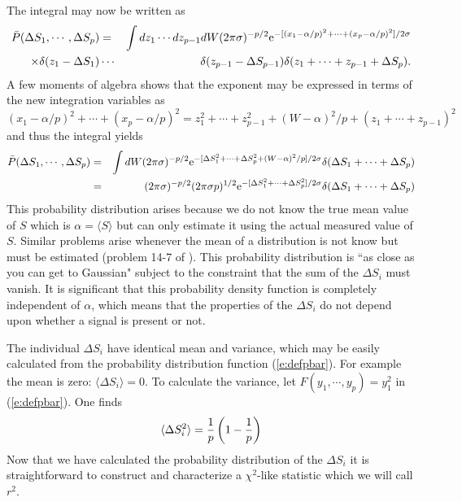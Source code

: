 The integral may now be written as
\begin{eqnarray}
\nonumber
\bar P (\Delta S_1,\cdots,\Delta S_p) &= &\int  dz_1 \cdots dz_{p-1} dW (2 \pi
\sigma)^{-p/2} {\rm e}^{-[(x_1 - \alpha/p)^2 + \cdots + (x_p - \alpha/p)^2]/ 2 \sigma} \\
\times \delta(z_1-\Delta S_1) & \cdots & \delta(z_{p-1}-\Delta S_{p-1}) \delta(z_1+\cdots + z_{p-1}+\Delta S_p).
\end{eqnarray}
A few moments of algebra shows that the exponent may be expressed in terms of the new
integration variables as
\begin{equation}
(x_1 - \alpha/p)^2 + \cdots + (x_p - \alpha/p)^2 =
z_1^2 + \cdots + z_{p-1}^2 + (W-\alpha)^2/p + (z_1 + \cdots + z_{p-1})^2
\end{equation}
and thus the integral yields
\begin{eqnarray}
\nonumber
\bar P (\Delta S_1,\cdots,\Delta S_p) & = & \int dW (2 \pi \sigma)^{-p/2}
{\rm e}^{-[\Delta S_1^2 + \cdots + \Delta S_p^2 + (W-\alpha)^2/p]/2\sigma} 
\delta(\Delta S_1 + \cdots +\Delta S_p)
\\
& = &
\label{e:deltaprob}
(2 \pi \sigma)^{-p/2} (2 \pi \sigma p)^{1/2} {\rm e}^{-[\Delta S_1^2 + \cdots + \Delta S_p^2]/2 \sigma}
\delta(\Delta S_1 + \cdots +\Delta S_p)
\end{eqnarray}
This probability distribution arises because we do not know the true mean
value of $S$ which is $\alpha=\langle S \rangle$ but can only estimate it
using the actual measured value of $S$.  Similar problems arise whenever
the mean of a distribution is not know but must be estimated (problem
14-7 of \cite{matthewsandwalker}).  This probability distribution is
``as close as you can get to Gaussian" subject to the constraint that
the sum of the $\Delta S_i$ must vanish.  It is significant that this
probability density function is completely independent of $\alpha$,
which means that the properties of the $\Delta S_i$ do not depend upon
whether a signal is present or not.

The individual $\Delta S_i$ have identical mean and variance, which may be
easily calculated from the probability distribution function (\ref{e:defpbar}).
For example the mean is zero: $\langle \Delta S_i \rangle = 0$.
To calculate the variance, let $ F(y_1,\cdots,y_p) = y_1^2$  in (\ref{e:defpbar}).
One finds
\begin{equation}
\label{e:vards}
\langle \Delta S_i^2 \rangle = {1 \over p}\left( 1 - {1 \over p} \right)
\end{equation}
Now that we have calculated the probability distribution of the $\Delta
S_i$ it is straightforward to construct and characterize a $\chi^2$-like
statistic which we will call $r^2$.  


